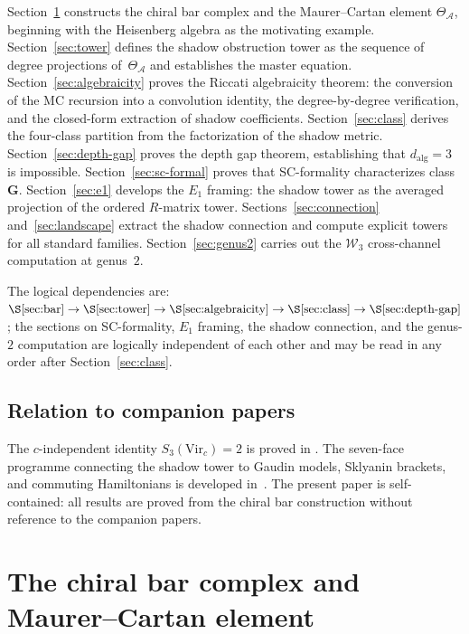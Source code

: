 \documentclass[11pt,reqno]{amsart}
\theoremstyle{definition}
\theoremstyle{remark}
\newcommand{\cA}{\mathcal{A}}
\newcommand{\cW}{\mathcal{W}}
\newcommand{\Vir}{\mathrm{Vir}}
\numberwithin{equation}{section}
\begin{document}
Section~\ref{sec:bar} constructs the chiral bar complex
and the Maurer--Cartan element $\Theta_\cA$, beginning
with the Heisenberg algebra as the motivating example.
Section~\ref{sec:tower} defines the shadow obstruction tower
as the sequence of degree projections of~$\Theta_\cA$ and
establishes the master equation.
Section~\ref{sec:algebraicity} proves the Riccati
algebraicity theorem: the conversion of the MC recursion
into a convolution identity, the degree-by-degree
verification, and the closed-form extraction of shadow
coefficients.
Section~\ref{sec:class} derives the four-class partition
from the factorization of the shadow metric.
Section~\ref{sec:depth-gap} proves the depth gap theorem,
establishing that $d_{\mathrm{alg}} = 3$ is impossible.
Section~\ref{sec:sc-formal} proves that SC-formality
characterizes class~$\mathbf{G}$.
Section~\ref{sec:e1} develops the $E_1$ framing: the
shadow tower as the averaged projection of the ordered
$R$-matrix tower.
Sections~\ref{sec:connection} and~\ref{sec:landscape}
extract the shadow connection and compute explicit towers
for all standard families.
Section~\ref{sec:genus2} carries out the $\cW_3$
cross-channel computation at genus~$2$.

The logical dependencies are:
$\text{\S\ref{sec:bar}} \to \text{\S\ref{sec:tower}} \to
\text{\S\ref{sec:algebraicity}} \to
\text{\S\ref{sec:class}} \to
\text{\S\ref{sec:depth-gap}}$;
the sections on SC-formality, $E_1$ framing, the shadow
connection, and the genus-$2$ computation are logically
independent of each other and may be read in any order
after Section~\ref{sec:class}.

\subsection{Relation to companion
papers}\label{subsec:companion}

The $c$-independent identity $S_3(\Vir_c) = 2$ is proved in
\cite{LorgatVirR}. The seven-face programme connecting the
shadow tower to Gaudin models, Sklyanin brackets, and
commuting Hamiltonians is developed
in~\cite{LorgatSevenFaces}. The present paper is
self-contained: all results are proved from the chiral bar
construction without reference to the companion papers.



\section{The chiral bar complex and Maurer--Cartan element}
\label{sec:bar}
\end{document}

